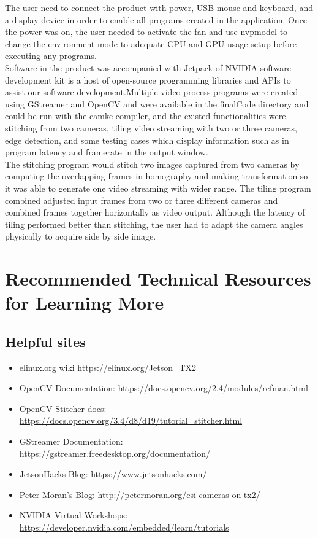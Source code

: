 \documentclass[letterpaper,10pt,serif,draftclsnofoot,onecolumn,compsoc,titlepage]{IEEEtran}
\begin{document}
The user need to connect the product with power, USB mouse and keyboard, and a display device in 
order to enable all programs created in the application. Once the power was on, the user needed 
to activate the fan and use nvpmodel to change the environment mode to adequate CPU and GPU usage 
setup before executing any programs. \\

Software in the product was accompanied with Jetpack of NVIDIA software development kit is a host 
of open-source programming libraries and APIs to assist our software development.Multiple video 
process programs were created using GStreamer and OpenCV and were available in the finalCode 
directory and could be run with the camke compiler, and the existed functionalities were stitching 
from two cameras, tiling video streaming with two or three cameras, edge detection, and some 
testing cases which display information such as in program latency and framerate in the output 
window. \\

The stitching program would stitch two images captured from two cameras by computing the overlapping 
frames in homography and making transformation so it was able to generate one video streaming with 
wider range. The tiling program combined adjusted input frames from two or three different cameras 
and combined frames together horizontally as video output. Although the latency of tiling performed 
better than stitching, the user had to adapt the camera angles physically to acquire side by side 
image. \\

\newpage

\section{Recommended Technical Resources for Learning More}
\subsection{Helpful sites}
\begin{itemize}
\item elinux.org wiki \url{https://elinux.org/Jetson_TX2}
\item OpenCV Documentation: \url{https://docs.opencv.org/2.4/modules/refman.html}
\item OpenCV Stitcher docs: \url{https://docs.opencv.org/3.4/d8/d19/tutorial_stitcher.html}
\item GStreamer Documentation: \url{https://gstreamer.freedesktop.org/documentation/}
\item JetsonHacks Blog: \url{https://www.jetsonhacks.com/}
\item Peter Moran's Blog: \url{http://petermoran.org/csi-cameras-on-tx2/}
\item NVIDIA Virtual Workshops: \url{https://developer.nvidia.com/embedded/learn/tutorials}
\end{itemize}
\end{document}
